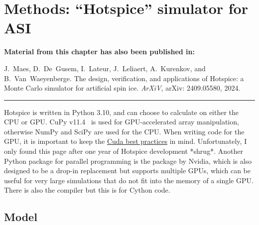 \chapter{Methods: ``Hotspice'' simulator for ASI}\label{ch:Hotspice}

\begin{adjustwidth}{2em}{2em} %
    \begin{center}
        \textbf{Material from this chapter has also been published in:} \\
    \end{center}
    \vspace{1em}
    J.~Maes, D.~De~Gusem, I.~Lateur, J.~Leliaert, A.~Kurenkov, and B.~Van~Waeyenberge.
    \newblock The design, verification, and applications of Hotspice: a Monte Carlo simulator for artificial spin ice.
    \newblock \emph{ArXiV}, arXiv: 2409.05580, 2024.
    \vspace{1em}
    \begin{center}
        \centering\rule{0.6\linewidth}{0.4pt}
    \end{center}
    \vspace{1em}
\end{adjustwidth}

Hotspice is written in Python 3.10, and can choose to calculate on either the CPU or GPU.
CuPy v11.4~\cite{CuPy} is used for GPU-accelerated array manipulation, otherwise NumPy and SciPy are used for the CPU.
When writing code for the GPU, it is important to keep the \href{https://docs.nvidia.com/cuda/cuda-c-best-practices-guide/index.html}{Cuda best practices} in mind.
Unfortunately, I only found this page after one year of Hotspice development *shrug*.
Another Python package for parallel programming is the  package by Nvidia, which is also designed to be a drop-in  replacement but supports multiple GPUs, which can be useful for very large simulations that do not fit into the memory of a single GPU.
There is also the  compiler but this is for Cython code. \par

\section{Model}

\cite{Hotspice}

\\

